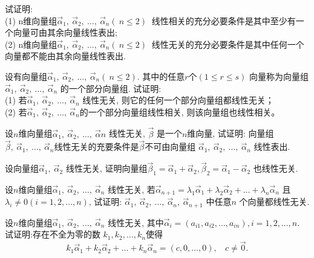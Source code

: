 \begin{ex}\label{4.10}
试证明:\\
(1) n维向量组$\vec{\alpha}_1, \ \vec{\alpha}_2, \ \dots,\ \vec{\alpha}_n(\ n\leq 2)\ $ 线性相关的充分必要条件是其中至少有一个向量可由其余向量线性表出;\\
(2) n维向量组$\vec{\alpha}_1, \ \vec{\alpha}_2, \ \dots,\ \vec{\alpha}_n(\ n\leq 2)\ $ 线性无关的充分必要条件是其中任何一个向量都不能由其余向量线性表出.
\end{ex}

\begin{ex}\label{4.11}
设有向量组$\vec{\alpha}_1, \ \vec{\alpha}_2, \ \dots,\ \vec{\alpha}_n(\ n\leq 2)$. 其中的任意$r$个$(1\leq r\leq s)$ 向量称为向量组$\vec{\alpha}_1, \ \vec{\alpha}_2, \ \dots,\ \vec{\alpha}_n$
的一个部分向量组. 试证明:\\
(1) 若$\vec{\alpha}_1, \ \vec{\alpha}_2, \ \dots,\ \vec{\alpha}_n$ 线性无关, 则它的任何一个部分向量组都线性无关；\\
(2) 若$\vec{\alpha}_1, \ \vec{\alpha}_2, \ \dots,\ \vec{\alpha}_n$的一个部分向量组线性相关, 则该向量组也线性相关。
\end{ex}

\begin{ex}\label{4.12}
设$n$维向量组$\vec{\alpha}_1, \ \vec{\alpha}_2, \ \dots,\ \vec{\alpha}n$ 线性无关, $\vec{\beta}$ 是一个$n$维向量,
试证明: 向量组$\vec{\beta},\ \vec{\alpha}_1, \ \dots,\ \vec{\alpha}_n$线性无关的充要条件是$\vec{\beta}$不可由向量组
$\vec{\alpha}_1, \ \vec{\alpha}_2, \ \dots,\ \vec{\alpha}_n$ 线性表出.
\end{ex}

\begin{ex}\label{4.13}
设向量组$\vec{\alpha}_1,\ \vec{\alpha}_2$ 线性无关,
证明向量组$\vec{\beta}_1=\vec{\alpha}_1+\vec{\alpha}_2, \vec{\beta}_2=\vec{\alpha}_1-\vec{\alpha}_2$ 也线性无关.
\end{ex}

\begin{ex}\label{4.14}
设$n$维向量组$\vec{\alpha}_1, \ \vec{\alpha}_2, \ \dots,\ \vec{\alpha}_n$ 线性无关, 若$\vec{\alpha}_{n+1}=\lambda_1\vec{\alpha}_1+\lambda_2\vec{\alpha}_2+\dots+\lambda_n\vec{\alpha}_n$ 且
$\lambda_i\not=0(i=1,2,\dots, n)$, 试证明: $\vec{\alpha}_1, \ \vec{\alpha}_2, \ \dots,\ \vec{\alpha}_n,\ \vec{\alpha}_{n+1}$ 中任意$n$ 个向量都线性无关.
\end{ex}

\begin{ex}\label{4.15}
设$n$维向量组$\vec{\alpha}_1, \ \vec{\alpha}_2, \ \dots,\ \vec{\alpha}_n$ 线性无关, 其中$\vec{\alpha}_i=(a_{i1},a_{i2},\dots,a_{in}),i=1,2,\dots,n.$ 试证明:存在不全为零的数
$k_1,k_2,\dots,k_n$使得$$k_1\vec{\alpha}_1+k_2\vec{\alpha}_2+\dots+k_n\vec{\alpha}_n=(c,0,\dots,0),\ \ \ \ c\not=\vec{0}.$$
\end{ex}

